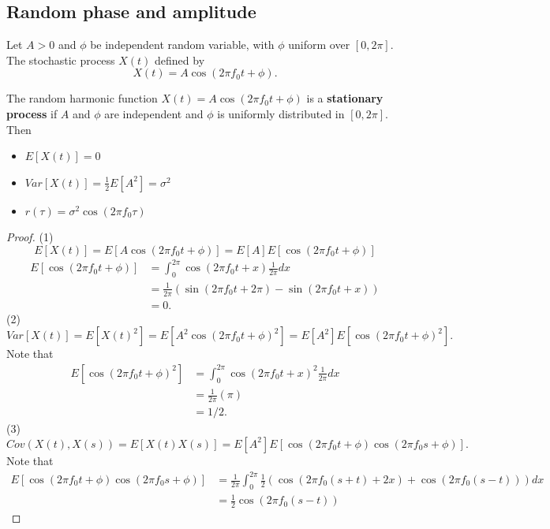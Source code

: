 \begin{refsection}
\subsection{Random phase and amplitude}
\begin{definition}\cite[35]{lindgren2013stationary}
	Let $A > 0$ and $\phi$ be independent random variable, with $\phi$ uniform over $[0,2\pi]$. The stochastic process $X(t)$ defined by
	$$X(t) = A \cos(2\pi f_0 t + \phi).$$	
\end{definition}



\begin{lemma}\cite[36]{lindgren2013stationary}
	The random harmonic function $X(t) = A\cos(2\pi f_0 t + \phi)$ is a \textbf{stationary process} if $A$ and $\phi$ are independent and $\phi$ is uniformly distributed in $[0,2\pi]$. Then
	\begin{itemize}
		\item $E[X(t)] = 0$
		\item $Var[X(t)] = \frac{1}{2}E[A^2] = \sigma^2$
		\item $r(\tau) = \sigma^2 \cos (2\pi f_0 \tau)$ 
	\end{itemize}	
\end{lemma}
\begin{proof}
	(1) $$E[X(t)] = E[A\cos(2\pi f_0 t + \phi)] =  E[A]E[\cos(2\pi f_0 t + \phi)]$$
	\begin{align*}
	E[\cos(2\pi f_0 t + \phi)] & = \int_0^{2\pi} \cos(2\pi f_0 t + x)\frac{1}{2\pi}dx \\
	&=\frac{1}{2\pi}(\sin(2\pi f_0 t + 2\pi) - \sin(2\pi f_0 t + x)) \\
	&= 0.
	\end{align*}	
	(2) $$Var[X(t)] = E[X(t)^2] = E[A^2\cos(2\pi f_0 t + \phi)^2] = E[A^2]E[\cos(2\pi f_0 t + \phi)^2].$$
	Note that
	\begin{align*}
	E[\cos(2\pi f_0 t + \phi)^2] & = \int_0^{2\pi} \cos(2\pi f_0 t + x)^2\frac{1}{2\pi}dx \\
	&=\frac{1}{2\pi}(\pi) \\
	&= 1/2.
	\end{align*}
	(3) $$Cov(X(t),X(s)) = E[X(t)X(s)] = E[A^2]E[\cos(2\pi f_0 t + \phi)\cos(2\pi f_0 s + \phi)].$$
	Note that
	\begin{align*}
	E[\cos(2\pi f_0 t + \phi)\cos(2\pi f_0 s + \phi)] & = \frac{1}{2\pi}\int_0^{2\pi} \frac{1}{2}(\cos(2\pi f_0 (s + t) + 2x) + \cos(2\pi f_0(s - t)) )dx \\
	&=\frac{1}{2} \cos(2\pi f_0(s - t))
	\end{align*}
\end{proof}




\end{refsection}
